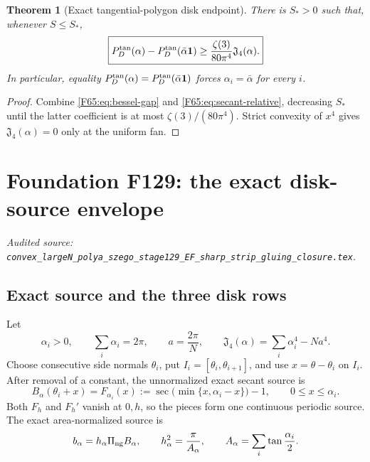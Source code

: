 \documentclass[11pt]{amsart}
\numberwithin{equation}{section}
\newtheorem{theorem}{Theorem}[section]
\theoremstyle{definition}
\theoremstyle{remark}
\newcommand{\PiNG}{\Pi_{\rm ng}}
\newcommand{\Jfour}{\mathfrak J_4}
\newcommand{\qD}{q_{\mathbb D}}
\begin{document}
\begin{theorem}[Exact tangential-polygon disk endpoint]\label{F65:thm:exact-disk}
There is $S_*>0$ such that, whenever $S\le S_*$,
\begin{equation}\label{F65:eq:exact-disk-gap}
 \boxed{
 P_D^{\rm tan}(\alpha)-P_D^{\rm tan}(\bar\alpha\mathbf1)
 \ge\frac{\zeta(3)}{80\pi^4}\Jfour(\alpha).}
\end{equation}
In particular, equality
$P_D^{\rm tan}(\alpha)=P_D^{\rm tan}(\bar\alpha\mathbf1)$ forces
$\alpha_i=\bar\alpha$ for every $i$.
\end{theorem}

\begin{proof}
Combine \eqref{F65:eq:bessel-gap} and \eqref{F65:eq:secant-relative}, decreasing
$S_*$ until the latter coefficient is at most
$\zeta(3)/(80\pi^4)$.  Strict convexity of $x^4$ gives
$\Jfour(\alpha)=0$ only at the uniform fan.
\end{proof}
\endgroup

\begingroup
\renewcommand{\qD}{q_D}
\section{Foundation F129: the exact disk-source envelope}
\label{module:F129}
\noindent\textit{Audited source: \nolinkurl{convex_largeN_polya_szego_stage129_EF_sharp_strip_gluing_closure.tex}.}
\subsection{Exact source and the three disk rows}

Let
\begin{equation}\label{F129:eq:fan}
 \alpha_i>0,\qquad \sum_i\alpha_i=2\pi,\qquad
 a=\frac{2\pi}{N},\qquad
 \Jfour(\alpha)=\sum_i\alpha_i^4-Na^4.
\end{equation}
Choose consecutive side normals \(\theta_i\), put
\(I_i=[\theta_i,\theta_{i+1}]\), and use \(x=\theta-\theta_i\) on
\(I_i\).  After removal of a constant, the unnormalized exact secant source
is
\begin{equation}\label{F129:eq:B}
 B_\alpha(\theta_i+x)
 =F_{\alpha_i}(x)
 :=\sec\bigl(\min\{x,\alpha_i-x\}\bigr)-1,
 \qquad 0\le x\le\alpha_i.
\end{equation}
Both \(F_h\) and \(F_h'\) vanish at \(0,h\), so the pieces form one
continuous periodic source.  The exact area-normalized source is
\begin{equation}\label{F129:eq:b}
 b_\alpha=h_\alpha\PiNG B_\alpha,\qquad
 h_\alpha^2=\frac{\pi}{A_\alpha},\qquad
 A_\alpha=\sum_i\tan\frac{\alpha_i}{2}.
\end{equation}
\end{document}
